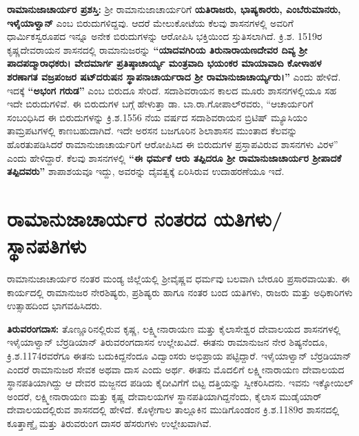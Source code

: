 \textbf{ರಾಮಾನುಜಾಚಾರ್ಯರ ಪ್ರಶಸ್ತಿ:} ಶ‍್ರೀ ರಾಮಾನುಜಾಚಾರ್ಯರಿಗೆ \textbf{ಯತಿರಾಜರು, ಭಾಷ್ಯಕಾರರು,\general{\break } ಎಂಬೆರುಮಾನರು, ಇಳೈಯಾಳ್ವಾನ್} ಎಂಬ ಬಿರುದುಗಳಿದ್ದವು. ಆದರೆ ಮೇಲುಕೋಟೆಯ ಕೆಲವು ಶಾಸನಗಳಲ್ಲಿ ಅವರಿಗೆ ಧಾರ್ಮಿಕಸ್ವರೂಪದ ಇನ್ನೂ ಅನೇಕ ಬಿರುದುಗಳನ್ನು ಆರೋಪಿಸಿ ಭಕ್ತಿಯಿಂದ ಸ್ತುತಿಸಲಾಗಿದೆ. ಕ್ರಿ.ಶ. 1519ರ ಕೃಷ್ಣದೇವರಾಯನ ಶಾಸನದಲ್ಲಿ ರಾಮಾನುಜರನ್ನು \textbf{“ಯಾದವಗಿರಿಯ ತಿರುನಾರಾಯಣದೇವರ ದಿವ್ಯ ಶ‍್ರೀ ಪಾದಪದ್ಮಾರಾಧಕರು। ವೇದಮಾರ್ಗ ಪ್ರತಿಷ್ಠಾಚಾರ್ಯ್ಯ ಮಂತ್ರವಾದಿ ಭಯಂಕರ ಮಾಯಾವಾದಿ ಕೋಳಾಹಳ ಶರಣಾಗತ ವಜ್ರಪಂಜರ ಷಟ್​ದರುಷನ ಸ್ಥಾಪನಾಚಾರ್ಯರಾದ ಶ‍್ರೀ ರಾಮಾನುಜಾಚಾರ್ಯ್ಯರು।”} ಎಂದು ಹೇಳಿದೆ. ಇದಕ್ಕೆ \textbf{“ಅಭಂಗ ಗರುಡ”} ಎಂಬ ಬಿರುದೂ ಸೇರಿದೆ. ಸದಾಶಿವರಾಯನ ಕಾಲದ ಮೂರು ಶಾಸನಗಳಲ್ಲಿಯೂ ಸಹ ಇದೇ ಬಿರುದುಗಳಿವೆ. ಈ ಬಿರುದುಗಳ ಬಗ್ಗೆ ಹೇಳುತ್ತಾ ಡಾ. ಬಾ.ರಾ.ಗೋಪಾಲ್​ರವರು, “ಆಚಾರ್ಯರಿಗೆ ಸಂಬಂಧಿಸಿದ ಈ ಬಿರುದುಗಳನ್ನು ಕ್ರಿ.ಶ.1556 ನೆಯ ವರ್ಷದ ಸದಾಶಿವರಾಯನ ಬ್ರಿಟಿಷ್​ ಮ್ಯೂಸಿಯಂ ತಾಮ್ರಪಟಗಳಲ್ಲಿ ಕಾಣಬಹುದಾಗಿದೆ. ಇದೇ ಅರಸನ ಬಜಗೂರಿನ ಶಿಲಾಶಾಸನ ಮುಂತಾದ ಕೆಲವನ್ನು ಹೊರತುಪಡಿಸಿದರೆ ರಾಮಾನುಜಾಚಾರ್ಯರಿಗೆ ಆರೋಪಿಸಿದ ಈ ಬಿರುದುಗಳ ಪ್ರಸ್ತಾಪವಿರುವ ಶಾಸನಗಳು ವಿರಳ” ಎಂದು ಹೇಳಿದ್ದಾರೆ. ಕೆಲವು ಶಾಸನಗಳಲ್ಲಿ \textbf{“ಈ ಧರ್ಮಕೆ ಆರು ತಪ್ಪಿದರೂ ಶ‍್ರೀ ರಾಮಾನುಜಾಚಾರ್ಯರ ಶ‍್ರೀಪಾದಕೆ ತಪ್ಪಿದವರು” } ಶಾಪಾಶಯವೂ ಇದ್ದು, ಅವರನ್ನು ದೈವತ್ವಕ್ಕೆ ಏರಿಸಿರುವ ಉದಾಹರಣೆಯೂ ಇದೆ.

\section*{ರಾಮಾನುಜಾಚಾರ್ಯರ ನಂತರದ ಯತಿಗಳು/ ಸ್ಥಾನಪತಿಗಳು}

ರಾಮಾನುಜಾಚಾರ್ಯರ ನಂತರ ಮಂಡ್ಯ ಜಿಲ್ಲೆಯಲ್ಲಿ ಶ‍್ರೀವೈಷ್ಣವ ಧರ್ಮವು ಬಲವಾಗಿ ಬೇರೂರಿ ಪ್ರಸಾರವಾಯಿತು. ಈ ಕಾರ್ಯದಲ್ಲಿ ರಾಮಾನುಜರ ನೇರಶಿಷ್ಯರು, ಪ್ರಶಿಷ್ಯರು ಹಾಗೂ ನಂತರ ಬಂದ ಯತಿಗಳು, ರಾಜರು ಮತ್ತು ಅಧಿಕಾರಿಗಳು ಉತ್ಸಾಹದಿಂದ ಭಾಗವಹಿಸಿದರು.

\textbf{ತಿರುವರಂಗದಾಸ:} ತೊಣ್ಣೂರಿನಲ್ಲಿರುವ ಕೃಷ್ಣ, ಲಕ್ಷ್ಮೀನಾರಾಯಣ ಮತ್ತು ಕೈಲಾಸೇಶ್ವರ ದೇವಾಲಯದ ಶಾಸನಗಳಲ್ಲಿ ಇಳೈಯಾಳ್ವಾನ್​ ಬೆರ್ರಡಿಯಾನ್​ ತಿರುವರಂಗದಾಸನ ಉಲ್ಲೇಖವಿದೆ. ಈತನು ರಾಮಾನುಜನ ನೇರ ಶಿಷ್ಯನೆಂದೂ, ಕ್ರಿ.ಶ.1174\-ರವರೆಗೂ ಈತನು ಬದುಕಿದ್ದನೆಂದೂ ವಿದ್ವಾಂಸರು ಅಭಿಪ್ರಾಯ ಪಟ್ಟಿದ್ದಾರೆ. ಇಳೈಯಾಳ್ವಾನ್​ ಬೆರ್ರಡಿಯಾನ್​ ಎಂದರೆ ರಾಮಾನುಜರ ಸೇವಕ ಅಥವಾ ದಾಸ ಎಂದು ಅರ್ಥ. ಈತನು ಮೊದಲಿಗೆ ಲಕ್ಷ್ಮೀನಾರಾಯಣ ದೇವಾಲಯದ ಸ್ಥಾನಪತಿಯಾಗಿದ್ದು ಆ ದೇವರ ಮಜ್ಜನದ ಪಡಿಯ ಕೈದೀವಿಗೆಗೆ ಬಿಟ್ಟ ದತ್ತಿಯನ್ನು ಸ್ವೀಕರಿಸಿದನು. ಇವನು ಇಕ್ಕೋಯಿಲ್​ ಅಂದರೆ, ಲಕ್ಷ್ಮೀನಾರಾಯಣ ಮತ್ತು ಕೃಷ್ಣ ದೇವಾಲಯಗಳ ಸ್ಥಾನಪತಿಯಾಗಿದ್ದನೆಂದು, ಕೈಲಾಸ ಮುಡೈಯಾರ್​ ದೇವಾಲಯ\-ದಲ್ಲಿರುವ ಶಾಸನದಲ್ಲಿ ಹೇಳಿದೆ. ಕೊಳ್ಳೇಗಾಲ ತಾಲ್ಲೂಕಿನ ಮುಡಿಗೊಂಡಂನ ಕ್ರಿ.ಶ.1189ರ ಶಾಸನದಲ್ಲಿ ಕೂತ್ತಾಣ್ಡೈ ಮತ್ತು ತಿರುವರುಂಗ ದಾಸರ ಹೆಸರುಗಳು ಉಲ್ಲೇಖವಾಗಿವೆ.


